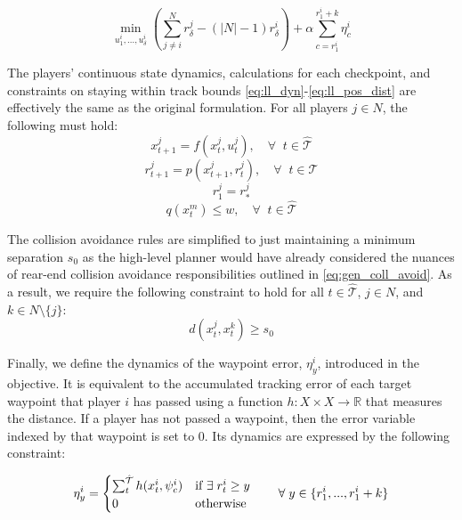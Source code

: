 \begin{equation} \label{eq:ll_obj}
    \min_{u^i_{1}, ..., u^i_{\delta}} (\sum^N_{j \neq i}r^j_{\delta} - (|N|-1) r^i_{\delta}) + \alpha \sum_{c={r^i_{1}}}^{{r^i_{1}}+k} \eta^i_c
\end{equation}

The players' continuous state dynamics, calculations for each checkpoint, and constraints on staying within track bounds \eqref{eq:ll_dyn}-\eqref{eq:ll_pos_dist} are effectively the same as the original formulation. For all players $j \in N$, the following must hold:
\begin{equation} \label{eq:ll_dyn}
    x^j_{t+1} = f(x^j_{t}, u^j_t), \quad \forall \;\; t \in \hat{\mathcal{T}}
\end{equation}
\begin{equation} \label{eq::ll_pos}
    r^j_{t+1} = p(x^j_{t+1}, r^j_t), \quad \forall \;\; t \in \hat{\mathcal{T}}
\end{equation}
\begin{equation} \label{eq::ll_pos_init}
    r^j_{1} = r^j_*
\end{equation}
\begin{equation} \label{eq:ll_pos_dist}
    q(x^m_{t}) \leq w, \quad \forall \;\; t \in \hat{\mathcal{T}}
\end{equation}

The collision avoidance rules are simplified to just maintaining a minimum separation $s_0$ as the high-level planner would have already considered the nuances of rear-end collision avoidance responsibilities outlined in \eqref{eq:gen_coll_avoid}. As a result, we require the following constraint to hold for all $t \in \hat{\mathcal{T}}$, $j \in N$, and $k \in N \setminus \{j\}$:
\begin{equation} \label{eq:ll_coll_avoid}
    d(x^j_{t}, x^k_t) \geq s_0
\end{equation}

Finally, we define the dynamics of the waypoint error, $\eta^i_y$, introduced in the objective. It is equivalent to the accumulated tracking error of each target waypoint that player $i$ has passed using a function $h: X\times X \rightarrow \mathbb{R}$ that measures the distance. If a player has not passed a waypoint, then the error variable indexed by that waypoint is set to 0. Its dynamics are expressed by the following constraint:

\begin{equation} \label{eq:ll_wp_err}
    \eta^i_y = \begin{cases} \sum_{t}^{\Hat{\mathcal{T}}} h(x^i_t, \psi^i_{c})  & \text{if } \exists \; r^i_t \geq y \\
    0 & \text{otherwise}
    \end{cases} \qquad \forall \; y \in \{r^i_{1}, ..., r^i_{1} + k\}
\end{equation}

